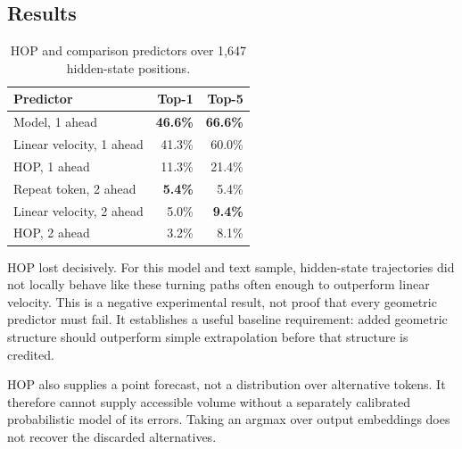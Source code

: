 \documentclass[11pt,a4paper]{article}
\begin{document}
\subsection{Results}
\begin{table}[htbp]
\centering
\caption{HOP and comparison predictors over 1,647 hidden-state positions.}
\label{tab:hop}
\begin{tabular}{lrr}
\toprule
Predictor & Top-1 & Top-5 \\
\midrule
Model, 1 ahead & \textbf{46.6\%} & \textbf{66.6\%} \\
Linear velocity, 1 ahead & 41.3\% & 60.0\% \\
HOP, 1 ahead & 11.3\% & 21.4\% \\
Repeat token, 2 ahead & \textbf{5.4\%} & 5.4\% \\
Linear velocity, 2 ahead & 5.0\% & \textbf{9.4\%} \\
HOP, 2 ahead & 3.2\% & 8.1\% \\
\bottomrule
\end{tabular}
\end{table}

HOP lost decisively. For this model and text sample, hidden-state trajectories did not locally behave like these turning paths often enough to outperform linear velocity. This is a negative experimental result, not proof that every geometric predictor must fail. It establishes a useful baseline requirement: added geometric structure should outperform simple extrapolation before that structure is credited.

HOP also supplies a point forecast, not a distribution over alternative tokens. It therefore cannot supply accessible volume without a separately calibrated probabilistic model of its errors. Taking an argmax over output embeddings does not recover the discarded alternatives.
\end{document}
